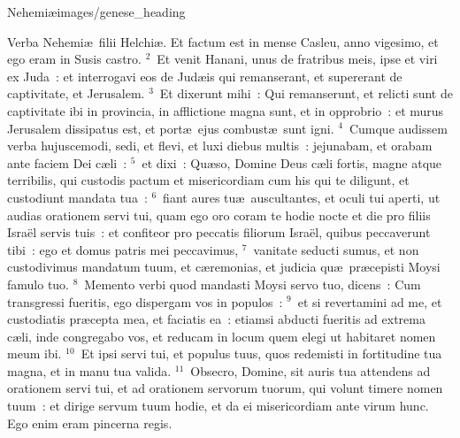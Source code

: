 {Nehemiæ}{images/genese_heading}


\lettrine[lines=10,image=true,loversize=0.05,lraise=-0.03]{V}{}erba Nehemi\ae\ filii Helchi\ae . Et factum est in mense Casleu, anno vigesimo, et ego eram in Susis castro.
${}^{2}$~Et venit Hanani, unus de fratribus meis, ipse et viri ex Juda~: et interrogavi eos de Jud\ae is qui remanserant, et supererant de captivitate, et Jerusalem.
${}^{3}$~Et dixerunt mihi~: Qui remanserunt, et relicti sunt de captivitate ibi in provincia, in afflictione magna sunt, et in opprobrio~: et murus Jerusalem dissipatus est, et port\ae\ ejus combust\ae\ sunt igni.
${}^{4}$~Cumque audissem verba hujuscemodi, sedi, et flevi, et luxi diebus multis~: jejunabam, et orabam ante faciem Dei c\ae li~:
${}^{5}$~et dixi~: Qu\ae so, Domine Deus c\ae li fortis, magne atque terribilis, qui custodis pactum et misericordiam cum his qui te diligunt, et custodiunt mandata tua~:
${}^{6}$~fiant aures tu\ae\ auscultantes, et oculi tui aperti, ut audias orationem servi tui, quam ego oro coram te hodie nocte et die pro filiis Isra\"el servis tuis~: et confiteor pro peccatis filiorum Isra\"el, quibus peccaverunt tibi~: ego et domus patris mei peccavimus,
${}^{7}$~vanitate seducti sumus, et non custodivimus mandatum tuum, et c\ae remonias, et judicia qu\ae\ pr\ae cepisti Moysi famulo tuo.
${}^{8}$~Memento verbi quod mandasti Moysi servo tuo, dicens~: Cum transgressi fueritis, ego dispergam vos in populos~:
${}^{9}$~et si revertamini ad me, et custodiatis pr\ae cepta mea, et faciatis ea~: etiamsi abducti fueritis ad extrema c\ae li, inde congregabo vos, et reducam in locum quem elegi ut habitaret nomen meum ibi.
${}^{10}$~Et ipsi servi tui, et populus tuus, quos redemisti in fortitudine tua magna, et in manu tua valida.
${}^{11}$~Obsecro, Domine, sit auris tua attendens ad orationem servi tui, et ad orationem servorum tuorum, qui volunt timere nomen tuum~: et dirige servum tuum hodie, et da ei misericordiam ante virum hunc. Ego enim eram pincerna regis.

